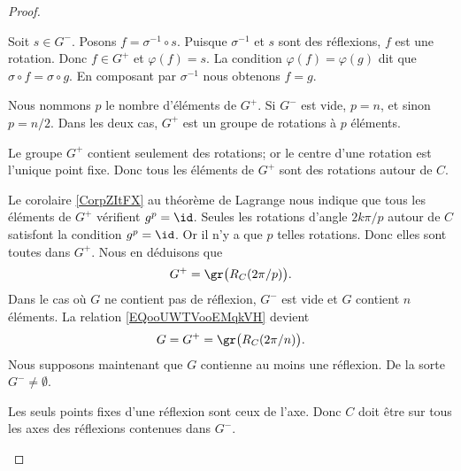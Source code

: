 \begin{proof}
\begin{subproof}
		\begin{subproof}
			\spitem[Surjective]
			Soit \( s\in G^-\). Posons \( f=\sigma^{-1}\circ s\). Puisque \( \sigma^{-1}\) et \( s\) sont des réflexions, \( f\) est une rotation. Donc \( f\in G^+\) et \( \varphi(f)=s\).
			\spitem[Injective]
			La condition \( \varphi(f)=\varphi(g)\) dit que \( \sigma\circ f=\sigma\circ g\). En composant par \( \sigma^{-1}\) nous obtenons \( f=g\).
		\end{subproof}
		\spitem[\( G=\gr\big(R_C(2\pi /p)\big)\)]
		Nous nommons \( p\) le nombre d'éléments de \( G^+\). Si \( G^-\) est vide, \( p=n\), et sinon \( p=n/2\). Dans les deux cas, \( G^+\) est un groupe de rotations à \( p\) éléments.

		Le groupe \( G^+\) contient seulement des rotations; or le centre d'une rotation est l'unique point fixe. Donc tous les éléments de \( G^+\) sont des rotations autour de \( C\).

		Le corolaire \ref{CorpZItFX} au théorème de Lagrange nous indique que tous les éléments de \( G^+\) vérifient \( g^p=\id\). Seules les rotations d'angle \( 2k\pi/p\) autour de \( C\) satisfont la condition \( g^p=\id\). Or il n'y a que \( p\) telles rotations. Donc elles sont toutes dans \( G^+\). Nous en déduisons que
		\begin{equation}        \label{EQooUWTVooEMqkVH}
			G^+=\gr\big( R_C(2\pi/p) \big).
		\end{equation}
		Dans le cas où \( G\) ne contient pas de réflexion, \( G^-\) est vide et \( G\) contient \( n\) éléments. La relation \eqref{EQooUWTVooEMqkVH} devient
		\begin{equation}
			G=G^+=\gr\big( R_C(2\pi/n) \big).
		\end{equation}
		Nous supposons maintenant que \( G\) contienne au moins une réflexion. De la sorte \( G^-\neq \emptyset\).
		\begin{subproof}
			Les seuls points fixes d'une réflexion sont ceux de l'axe. Donc \( C\) doit être sur tous les axes des réflexions contenues dans \( G^-\).


\end{subproof}
\end{subproof}
\end{proof}
